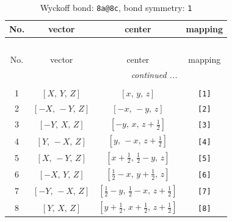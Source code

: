 \documentclass[fleqn,8pt]{jsarticle}
\begin{document}
\begin{longtable}{cccc}
\caption{Wyckoff bond: {\tt 8a@8c}, bond symmetry: {\tt 1}}
 \\
 \hline \hline
No. & vector & center & mapping \\ \hline \endfirsthead

\multicolumn{3}{l}{\tablename\ \thetable{}} \\
 \hline \hline
No. & vector & center & mapping \\ \hline \endhead

 \hline \hline
\multicolumn{3}{r}{\footnotesize\it continued ...} \\ \endfoot

 \hline \hline
\multicolumn{3}{r}{} \\ \endlastfoot

1 & $\left[ X,\, Y,\, Z \right]$ & $\left[ x,\, y,\, z \right]$ & {\tt [1]} \\ \hline
2 & $\left[ - X,\, - Y,\, Z \right]$ & $\left[ - x,\, - y,\, z \right]$ & {\tt [2]} \\ \hline
3 & $\left[ - Y,\, X,\, Z \right]$ & $\left[ - y,\, x,\, z + \frac{1}{2} \right]$ & {\tt [3]} \\ \hline
4 & $\left[ Y,\, - X,\, Z \right]$ & $\left[ y,\, - x,\, z + \frac{1}{2} \right]$ & {\tt [4]} \\ \hline
5 & $\left[ X,\, - Y,\, Z \right]$ & $\left[ x + \frac{1}{2},\, \frac{1}{2} - y,\, z \right]$ & {\tt [5]} \\ \hline
6 & $\left[ - X,\, Y,\, Z \right]$ & $\left[ \frac{1}{2} - x,\, y + \frac{1}{2},\, z \right]$ & {\tt [6]} \\ \hline
7 & $\left[ - Y,\, - X,\, Z \right]$ & $\left[ \frac{1}{2} - y,\, \frac{1}{2} - x,\, z + \frac{1}{2} \right]$ & {\tt [7]} \\ \hline
8 & $\left[ Y,\, X,\, Z \right]$ & $\left[ y + \frac{1}{2},\, x + \frac{1}{2},\, z + \frac{1}{2} \right]$ & {\tt [8]} \\
\end{longtable}
\end{document}
